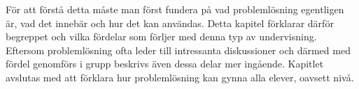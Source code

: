 För att förstå detta måste man först fundera på vad problemlösning egentligen är, vad det innebär och hur det kan användas. Detta kapitel förklarar därför begreppet och vilka fördelar som förljer med denna typ av undervisning. Eftersom problemlösning ofta leder till intressanta diskussioner och därmed med fördel genomförs i grupp beskrivs även dessa delar mer ingående. Kapitlet avslutas med att förklara hur problemlösning kan gynna alla elever, oavsett nivå.